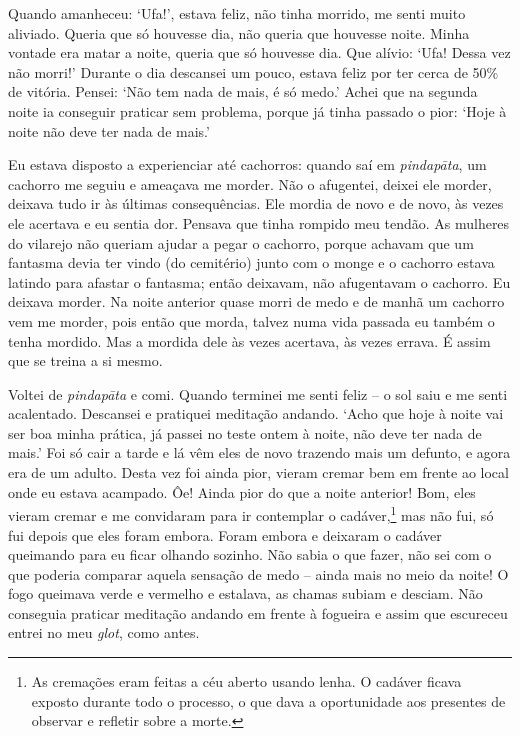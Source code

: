 Quando amanheceu: `Ufa!', estava feliz, não tinha morrido, me senti
muito aliviado. Queria que só houvesse dia, não queria que houvesse
noite. Minha vontade era matar a noite, queria que só houvesse dia. Que
alívio: `Ufa! Dessa vez não morri!' Durante o dia descansei um pouco,
estava feliz por ter cerca de 50\% de vitória. Pensei: `Não tem nada de
mais, é só medo.' Achei que na segunda noite ia conseguir praticar sem
problema, porque já tinha passado o pior: `Hoje à noite não deve ter
nada de mais.'

Eu estava disposto a experienciar até cachorros: quando saí em
\emph{pindapāta}, um cachorro me seguiu e ameaçava me morder. Não o
afugentei, deixei ele morder, deixava tudo ir às últimas consequências.
Ele mordia de novo e de novo, às vezes ele acertava e eu sentia dor.
Pensava que tinha rompido meu tendão. As mulheres do vilarejo não
queriam ajudar a pegar o cachorro, porque achavam que um fantasma devia
ter vindo (do cemitério) junto com o monge e o cachorro estava latindo
para afastar o fantasma; então deixavam, não afugentavam o cachorro. Eu
deixava morder. Na noite anterior quase morri de medo e de manhã um
cachorro vem me morder, pois então que morda, talvez numa vida passada
eu também o tenha mordido. Mas a mordida dele às vezes acertava, às
vezes errava. É assim que se treina a si mesmo.

Voltei de \emph{pindapāta} e comi. Quando terminei me senti feliz -- o
sol saiu e me senti acalentado. Descansei e pratiquei meditação andando.
`Acho que hoje à noite vai ser boa minha prática, já passei no teste
ontem à noite, não deve ter nada de mais.' Foi só cair a tarde e lá vêm
eles de novo trazendo mais um defunto, e agora era de um adulto. Desta
vez foi ainda pior, vieram cremar bem em frente ao local onde eu estava
acampado. Ôe! Ainda pior do que a noite anterior! Bom, eles vieram
cremar e me convidaram para ir contemplar o cadáver,\footnote{As
  cremações eram feitas a céu aberto usando lenha. O cadáver ficava
  exposto durante todo o processo, o que dava a oportunidade aos
  presentes de observar e refletir sobre a morte.} mas não fui, só fui
depois que eles foram embora. Foram embora e deixaram o cadáver
queimando para eu ficar olhando sozinho. Não sabia o que fazer, não sei
com o que poderia comparar aquela sensação de medo -- ainda mais no meio
da noite! O fogo queimava verde e vermelho e estalava, as chamas subiam
e desciam. Não conseguia praticar meditação andando em frente à fogueira
e assim que escureceu entrei no meu \emph{glot}, como antes.

